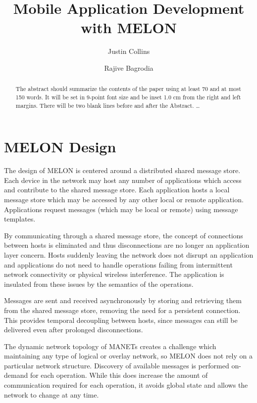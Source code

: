 \documentclass{llncs}
\begin{document}
%
\title{Mobile Application Development with MELON}
%
\author{Justin Collins \and Rajive Bagrodia}
%
%

\maketitle              %

\begin{abstract}
The abstract should summarize the contents of the paper
using at least 70 and at most 150 words. It will be set in 9-point
font size and be inset 1.0 cm from the right and left margins.
There will be two blank lines before and after the Abstract. \dots
{}
\end{abstract}
%
\section{MELON Design}\label{sec:design}

The design of MELON is centered around a distributed shared message store. Each device in the network may host any number of applications which access and contribute to the shared message store. Each application hosts a local message store which may be accessed by any other local or remote application. Applications request messages (which may be local or remote) using message templates.

By communicating through a shared message store, the concept of connections between hosts is eliminated and thus disconnections are no longer an application layer concern. Hosts suddenly leaving the network does not disrupt an application and applications do not need to handle operations failing from intermittent network connectivity or physical wireless interference. The application is insulated from these issues by the semantics of the operations.

Messages are sent and received asynchronously by storing and retrieving them from the shared message store, removing the need for a persistent connection. This provides temporal decoupling between hosts, since messages can still be delivered even after prolonged disconnections.

The dynamic network topology of MANETs creates a challenge which maintaining any type of logical or overlay network, so MELON does not rely on a particular network structure. Discovery of available messages is performed on-demand for each operation. While this does increase the amount of communication required for each operation, it avoids global state and allows the network to change at any time.
\end{document}
